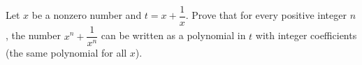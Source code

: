Let $x$ be a nonzero number and $t=x+\dfrac{1}{x}$. Prove that for every positive integer $n$, the number $x^n+\dfrac{1}{x^n}$ can be written as a polynomial in $t$ with integer coefficients (the same polynomial for all $x$).
